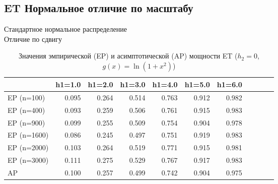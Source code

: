 \documentclass[12pt]{beamer}
\begin{document}
\subsection*{ET Нормальное отличие по масштабу}
\begin{frame}{Стандартное нормальное распределение\\ Отличие по сдвигу}
\begin{table}[!h]
	\centering
	\caption{Значения эмпирической (EP) и асимптотической (AP) мощности ET ($h_2=0$, $g(x)=\ln(1+x^2)$)}
	\hspace*{-1.0cm}\begin{tabular}
		{lrrrrrrrrrr}
		\toprule
		& h1=1.0 & h1=2.0 & h1=3.0 & h1=4.0 & h1=5.0 & h1=6.0 \\
		\midrule
		EP (n=100) & 0.095 & 0.264 & 0.514 & 0.763 & 0.912 & 0.982 \\
		EP (n=400) & 0.093 & 0.259 & 0.506 & 0.761 & 0.915 & 0.983 \\
		EP (n=900) & 0.099 & 0.255 & 0.509 & 0.754 & 0.904 & 0.978\\
		EP (n=1600) & 0.086 & 0.245 & 0.497 & 0.751 & 0.919 & 0.983\\
		EP (n=2000) & 0.103 & 0.264 & 0.519 & 0.771 & 0.915 & 0.981\\
		EP (n=3000) & 0.111 & 0.275 & 0.529 & 0.767 & 0.917 & 0.983\\
		\addlinespace
		AP & 0.100 & 0.257 & 0.499 & 0.742 & 0.904 & 0.975 \\
		\bottomrule
	\end{tabular}
	\label{tbl:ap_normal_h1_diff}
\end{table}
\end{frame}
\end{document}
